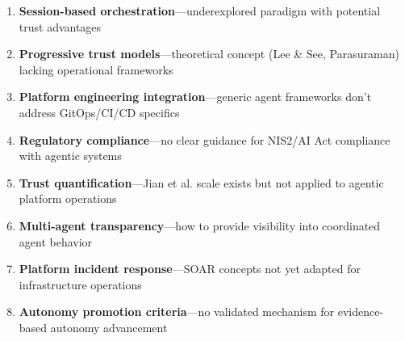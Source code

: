 \begin{enumerate}
    \item \textbf{Session-based orchestration}---underexplored paradigm with potential trust advantages
    \item \textbf{Progressive trust models}---theoretical concept (Lee \& See, Parasuraman) lacking operational frameworks
    \item \textbf{Platform engineering integration}---generic agent frameworks don't address GitOps/CI/CD specifics
    \item \textbf{Regulatory compliance}---no clear guidance for NIS2/AI Act compliance with agentic systems
    \item \textbf{Trust quantification}---Jian et al. scale exists but not applied to agentic platform operations
    \item \textbf{Multi-agent transparency}---how to provide visibility into coordinated agent behavior
    \item \textbf{Platform incident response}---SOAR concepts not yet adapted for infrastructure operations
    \item \textbf{Autonomy promotion criteria}---no validated mechanism for evidence-based autonomy advancement
\end{enumerate}
